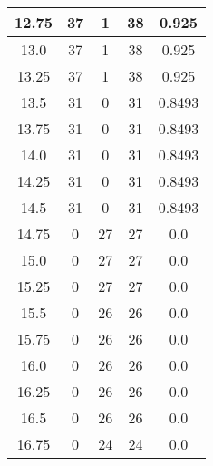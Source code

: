 \documentclass[letterpaper, 12pt]{article}
\begin{document}
\begin{longtable}{|c|c|c|c|c|}
\hline
12.75 & 37 & 1 & 38 & 0.925 \\
\hline
13.0 & 37 & 1 & 38 & 0.925 \\
\hline
13.25 & 37 & 1 & 38 & 0.925 \\
\hline
13.5 & 31 & 0 & 31 & 0.8493 \\
\hline
13.75 & 31 & 0 & 31 & 0.8493 \\
\hline
14.0 & 31 & 0 & 31 & 0.8493 \\
\hline
14.25 & 31 & 0 & 31 & 0.8493 \\
\hline
14.5 & 31 & 0 & 31 & 0.8493 \\
\hline
14.75 & 0 & 27 & 27 & 0.0 \\
\hline
15.0 & 0 & 27 & 27 & 0.0 \\
\hline
15.25 & 0 & 27 & 27 & 0.0 \\
\hline
15.5 & 0 & 26 & 26 & 0.0 \\
\hline
15.75 & 0 & 26 & 26 & 0.0 \\
\hline
16.0 & 0 & 26 & 26 & 0.0 \\
\hline
16.25 & 0 & 26 & 26 & 0.0 \\
\hline
16.5 & 0 & 26 & 26 & 0.0 \\
\hline
16.75 & 0 & 24 & 24 & 0.0 \\
\hline
\end{longtable}
\end{document}
